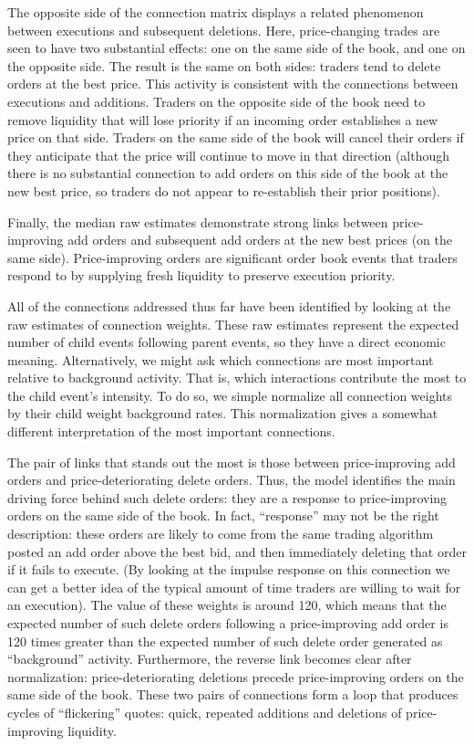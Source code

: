 The opposite side of the connection matrix displays a related phenomenon between executions and subsequent deletions. Here, price-changing trades are seen to have two substantial effects: one on the same side of the book, and one on the opposite side. The result is the same on both sides: traders tend to delete orders at the best price. This activity is consistent with the connections between executions and additions. Traders on the opposite side of the book need to remove liquidity that will lose priority if an incoming order establishes a new price on that side. Traders on the same side of the book will cancel their orders if they anticipate that the price will continue to move in that direction (although there is no substantial connection to add orders on this side of the book at the new best price, so traders do not appear to re-establish their prior positions).

Finally, the median raw estimates demonstrate strong links between price-improving add orders and subsequent add orders at the new best prices (on the same side). Price-improving orders are significant order book events that traders respond to by supplying fresh liquidity to preserve execution priority.

All of the connections addressed thus far have been identified by looking at the raw estimates of connection weights. These raw estimates represent the expected number of child events following parent events, so they have a direct economic meaning. Alternatively, we might ask which connections are most important relative to background activity. That is, which interactions contribute the most to the child event’s intensity. To do so, we simple normalize all connection weights by their child weight background rates. This normalization gives a somewhat different interpretation of the most important connections.

The pair of links that stands out the most is those between price-improving add orders and price-deteriorating delete orders. Thus, the model identifies the main driving force behind such delete orders: they are a response to price-improving orders on the same side of the book. In fact, “response” may not be the right description: these orders are likely to come from the same trading algorithm posted an add order above the best bid, and then immediately deleting that order if it fails to execute. (By looking at the impulse response on this connection we can get a better idea of the typical amount of time traders are willing to wait for an execution). The value of these weights is around 120, which means that the expected number of such delete orders following a price-improving add order is 120 times greater than the expected number of such delete order generated as “background” activity. Furthermore, the reverse link becomes clear after normalization: price-deteriorating deletions precede price-improving orders on the same side of the book. These two pairs of connections form a loop that produces cycles of “flickering” quotes: quick, repeated additions and deletions of price-improving liquidity.

